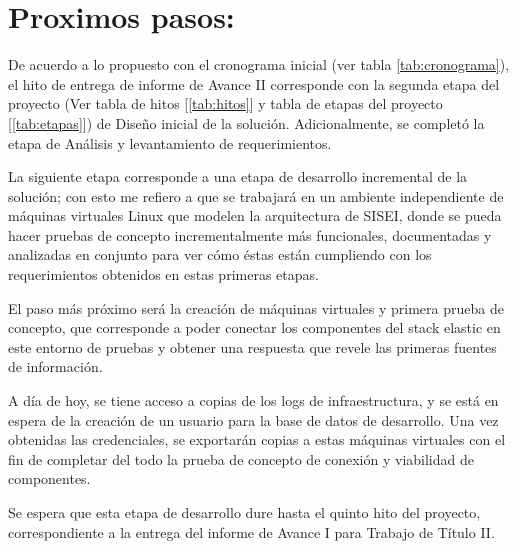 \section{Proximos pasos:}

De acuerdo a lo propuesto con el cronograma inicial (ver tabla \ref{tab:cronograma}), el hito de entrega de informe de Avance II corresponde con la segunda etapa del proyecto (Ver tabla de hitos [\ref{tab:hitos}] y tabla de etapas del proyecto [\ref{tab:etapas}]) de Diseño inicial de la solución. Adicionalmente, se completó la etapa de Análisis y levantamiento de requerimientos.

La siguiente etapa corresponde a una etapa de desarrollo incremental de la solución; con esto me refiero a que se trabajará en un ambiente independiente de máquinas virtuales Linux que modelen la arquitectura de SISEI, donde se pueda hacer pruebas de concepto incrementalmente más funcionales, documentadas y analizadas en conjunto para ver cómo éstas están cumpliendo con los requerimientos obtenidos en estas primeras etapas.

El paso más próximo será la creación de máquinas virtuales y primera prueba de concepto, que corresponde a poder conectar los componentes del stack elastic en este entorno de pruebas y obtener una respuesta que revele las primeras fuentes de información.

A día de hoy, se tiene acceso a copias de los logs de infraestructura, y se está en espera de la creación de un usuario para la base de datos de desarrollo. Una vez obtenidas las credenciales, se exportarán copias a estas máquinas virtuales con el fin de completar del todo la prueba de concepto de conexión y viabilidad de componentes.

Se espera que esta etapa de desarrollo dure hasta el quinto hito del proyecto, correspondiente a la entrega del informe de Avance I para Trabajo de Título II.

\clearpage
